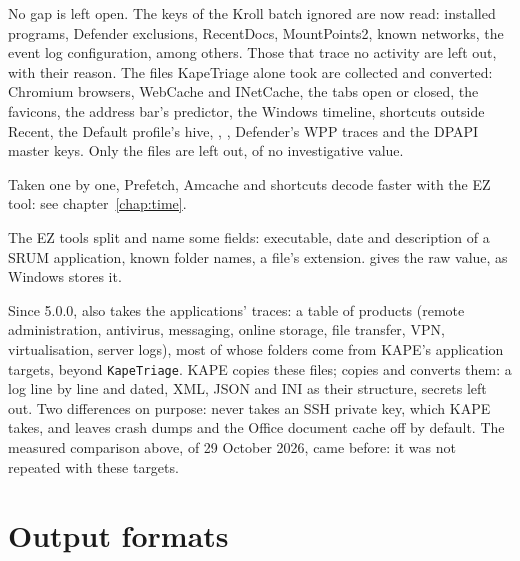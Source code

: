 \documentclass[11pt,a4paper,oneside]{report}
\begin{document}
\begin{description}[style=nextline,leftmargin=1em]
  \item[Coverage] No gap is left open. The keys of the Kroll batch \wac{}
        ignored are now read: installed programs, Defender exclusions,
        RecentDocs, MountPoints2, known networks, the event log configuration,
        among others. Those that trace no activity are left out, with their
        reason.
        The files KapeTriage alone took are collected and converted: Chromium
        browsers, WebCache and INetCache, the tabs open or closed, the
        favicons, the address bar's predictor, the Windows timeline, shortcuts
        outside Recent, the Default profile's hive,
        , , Defender's WPP traces and
        the DPAPI master keys. Only the  files are left
        out, of no investigative value.
  \item[Speed on small artefacts] Taken one by one, Prefetch, Amcache and
        shortcuts decode faster with the EZ tool: see
        chapter~\ref{chap:time}.
  \item[Ready-to-read interpretations] The EZ tools split and name some fields:
        executable, date and description of a SRUM application, known folder
        names, a file's extension. \wac{} gives the raw value, as Windows stores
        it.
\end{description}

\begin{attention}
Since 5.0.0, \wac{} also takes the applications' traces: a table of products
(remote administration, antivirus, messaging, online storage, file transfer,
VPN, virtualisation, server logs), most of whose folders come from KAPE's
application targets, beyond \texttt{KapeTriage}. KAPE copies these files;
\wac{} copies and converts them: a log line by line and dated, XML, JSON and
INI as their structure, secrets left out. Two differences on purpose: \wac{}
never takes an SSH private key, which KAPE takes, and leaves crash dumps and
the Office document cache off by default. The measured comparison above, of
29 October 2026, came before: it was not repeated with these targets.
\end{attention}

\chapter{Output formats}
\end{document}

